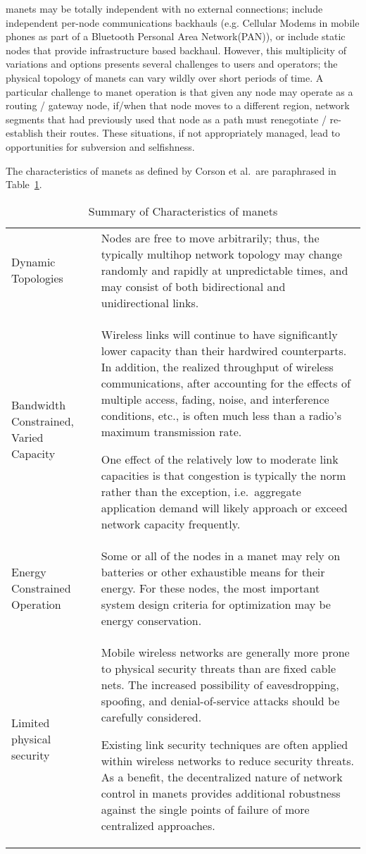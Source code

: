 \glspl{manet} may be totally independent with no external connections; include independent per-node communications backhauls (e.g. Cellular Modems in mobile phones as part of a Bluetooth Personal Area Network(PAN)), or include static nodes that provide infrastructure based backhaul.
However, this multiplicity of variations and options presents several challenges to users and operators; the physical topology of \glspl{manet} can vary wildly over short periods of time.
A particular challenge to \gls{manet} operation is that given any node may operate as a routing / gateway node, if/when that node moves to a different region, network segments that had previously used that node as a path must renegotiate / re-establish their routes.
These situations, if not appropriately managed, lead to opportunities for subversion and selfishness.

The characteristics of \gls{manet}s as defined by Corson et al.\ are paraphrased in Table~\ref{tab:manet_characteristics}.

\begin{table}[h!]
\caption[Summary of Characteristics of \gls{manet}s]{Summary of Characteristics of \gls{manet}s\cite{Corson1999}}
\label{tab:manet_characteristics}
  \begin{tabularx}{\textwidth}{p{2cm}X}\toprule
    Dynamic Topologies & Nodes are free to move arbitrarily; thus, the typically multihop network topology may change randomly and rapidly at unpredictable times, and may consist of both bidirectional and unidirectional links.
\\
    Bandwidth Constrained, Varied Capacity & Wireless links will continue to have significantly lower capacity than their hardwired counterparts.
In addition, the realized throughput of wireless communications, after accounting for the effects of multiple access, fading, noise, and interference conditions, etc., is often much less than a radio's maximum transmission rate.
\par
One effect of the relatively low to moderate link capacities is that congestion is typically the norm rather than the exception, i.e.\  aggregate application demand will likely approach or exceed network capacity frequently.\\
    Energy Constrained Operation &  Some or all of the nodes in a \gls{manet} may rely on batteries or other exhaustible means for their energy.
For these nodes, the most important system design criteria for optimization may be energy conservation.\\
    Limited physical security & Mobile wireless networks are generally more prone to physical security threats than are fixed cable nets.
The increased possibility of eavesdropping, spoofing, and denial-of-service attacks should be carefully considered.\par
Existing link security techniques are often applied within wireless networks to reduce security threats.
As a benefit, the decentralized nature of network control in \glspl{manet} provides additional robustness against the single points of failure of more centralized approaches.\\\bottomrule
\end{tabularx}
\end{table}

